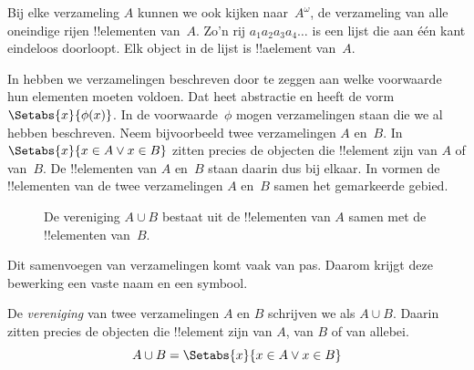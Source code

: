 \documentclass[openany]{memoir}
\begin{document}
\begin{ex}
Bij elke verzameling $A$ kunnen we ook kijken naar~$A^\omega$, de verzameling
van alle oneindige rijen !!{element}en van~$A$. Zo'n rij
$a_1a_2a_3a_4\dots$ is een lijst die aan één kant eindeloos doorloopt.
Elk object in de lijst is !!a{element} van~$A$.
\end{ex}
\endgroup

\begingroup
\def\olfilename{OLP-0008}
\def\olfilepath{content/sets-functions-relations/sets/}
\hypertarget{unit-OLP-0008}{}




\begin{explain}
In  hebben we verzamelingen beschreven door te
zeggen aan welke voorwaarde hun elementen moeten voldoen. Dat heet abstractie
en heeft de vorm $\Setabs{x}{\phi(x)}$. In de voorwaarde~$\phi$ mogen
verzamelingen staan die we al hebben beschreven. Neem bijvoorbeeld twee
verzamelingen $A$ en~$B$. In $\Setabs{x}{x \in A \lor x \in B}$ zitten precies
de objecten die !!{element} zijn van $A$ of van~$B$. De !!{element}en van $A$
en~$B$ staan daarin dus bij elkaar. In  vormen de
!!{element}en van de twee verzamelingen $A$ en~$B$ samen het gemarkeerde gebied.

\begin{figure}
  \caption{De vereniging $A \cup B$ bestaat uit de !!{element}en van $A$
   samen met de !!{element}en van~$B$.}
\end{figure}

Dit samenvoegen van verzamelingen komt vaak van pas. Daarom krijgt deze
bewerking een vaste naam en een symbool.
\end{explain}

\begin{defn}[Vereniging]
De \emph{vereniging} van twee verzamelingen $A$ en $B$ schrijven we als
$A \cup B$. Daarin zitten precies de objecten die !!{element} zijn van $A$,
van $B$ of van allebei.
\[
A \cup B = \Setabs{x}{x \in A \lor x \in B}
\]
\end{defn}
\end{document}
